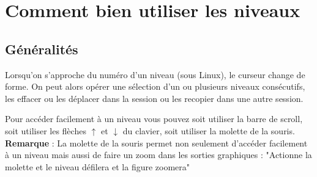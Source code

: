 \documentclass[a4paper,11pt]{article}
\begin{document}
\section{Comment bien utiliser les niveaux}
\subsection{G\'en\'eralit\'es}
Lorsqu'on s'approche du num\'ero d'un niveau (sous Linux), le curseur 
change de forme. On peut alors op\'erer une s\'election d'un ou
plusieurs niveaux cons\'ecutifs, les effacer ou les d\'eplacer dans la
session ou les recopier dans une autre session.
 
Pour acc\'eder facilement \`a un niveau vous pouvez soit utiliser la barre de 
scroll, soit utiliser les fl\`eches $\uparrow$ et $\downarrow$ du clavier, soit
utiliser la molette de la souris.\\
{\bf Remarque} :
La molette de la souris permet non seulement d'acc\'eder facilement \`a un 
niveau mais aussi de faire un zoom dans les sorties graphiques :
"Actionne la molette et le niveau d\'efilera et la figure zoomera"
\end{document}
